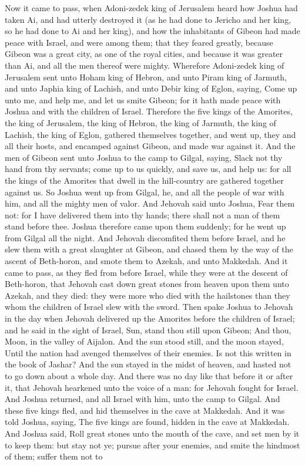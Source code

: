 Now it came to pass, when Adoni-zedek king of Jerusalem heard how Joshua had taken Ai, and had utterly destroyed it (as he had done to Jericho and her king, so he had done to Ai and her king), and how the inhabitants of Gibeon had made peace with Israel, and were among them; that they feared greatly, because Gibeon was a great city, as one of the royal cities, and because it was greater than Ai, and all the men thereof were mighty. Wherefore Adoni-zedek king of Jerusalem sent unto Hoham king of Hebron, and unto Piram king of Jarmuth, and unto Japhia king of Lachish, and unto Debir king of Eglon, saying, Come up unto me, and help me, and let us smite Gibeon; for it hath made peace with Joshua and with the children of Israel. Therefore the five kings of the Amorites, the king of Jerusalem, the king of Hebron, the king of Jarmuth, the king of Lachish, the king of Eglon, gathered themselves together, and went up, they and all their hosts, and encamped against Gibeon, and made war against it.  And the men of Gibeon sent unto Joshua to the camp to Gilgal, saying, Slack not thy hand from thy servants; come up to us quickly, and save us, and help us: for all the kings of the Amorites that dwell in the hill-country are gathered together against us. So Joshua went up from Gilgal, he, and all the people of war with him, and all the mighty men of valor. And Jehovah said unto Joshua, Fear them not: for I have delivered them into thy hands; there shall not a man of them stand before thee. Joshua therefore came upon them suddenly; for he went up from Gilgal all the night. And Jehovah discomfited them before Israel, and he slew them with a great slaughter at Gibeon, and chased them by the way of the ascent of Beth-horon, and smote them to Azekah, and unto Makkedah. And it came to pass, as they fled from before Israel, while they were at the descent of Beth-horon, that Jehovah cast down great stones from heaven upon them unto Azekah, and they died: they were more who died with the hailstones than they whom the children of Israel slew with the sword.  Then spake Joshua to Jehovah in the day when Jehovah delivered up the Amorites before the children of Israel; and he said in the sight of Israel, Sun, stand thou still upon Gibeon; And thou, Moon, in the valley of Aijalon.  And the sun stood still, and the moon stayed, Until the nation had avenged themselves of their enemies. Is not this written in the book of Jashar? And the sun stayed in the midst of heaven, and hasted not to go down about a whole day. And there was no day like that before it or after it, that Jehovah hearkened unto the voice of a man: for Jehovah fought for Israel.  And Joshua returned, and all Israel with him, unto the camp to Gilgal.  And these five kings fled, and hid themselves in the cave at Makkedah. And it was told Joshua, saying, The five kings are found, hidden in the cave at Makkedah. And Joshua said, Roll great stones unto the mouth of the cave, and set men by it to keep them: but stay not ye; pursue after your enemies, and smite the hindmost of them; suffer them not to 